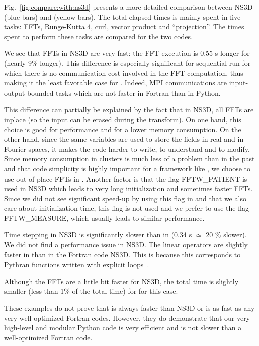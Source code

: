 Fig.~\ref{fig:compare:with:ns3d} presents a more detailed comparison between NS3D
(blue bars) and  (yellow bars).
%
The total elapsed times is mainly spent in five tasks: FFTs, Runge-Kutta 4, curl,
vector product and ``projection''. The times spent to perform these tasks are
compared for the two codes.

We see that FFTs in NS3D are very fast: the FFT execution is 0.55 s longer for
 (nearly 9\% longer). This difference is especially significant for
sequential run for which there is no communication cost involved in the FFT
computation, thus making it the least favorable case for .
Indeed, MPI communications are input-output bounded tasks which are not faster
in Fortran than in Python.

This difference can partially be explained by the fact that in NS3D, all FFTs are
inplace (so the input can be erased during the transform). On one hand, this
choice is good for performance and for a lower memory consumption.  On the other
hand, since the same variables are used to store the fields in real and in Fourier
spaces, it makes the code harder to write, to understand and to modify.  Since
memory consumption in clusters is much less of a problem than in the
past and that code simplicity is highly important for a framework like
, we choose to use out-of-place FFTs in .
%
Another factor is that the flag FFTW\_PATIENT is used in NS3D which leads to very
long initialization and sometimes faster FFTs. Since we did not see significant
speed-up by using this flag in  and that we also care about
initialization time, this flag is not used and we prefer to use the flag
FFTW\_MEASURE, which usually leads to similar performance.

Time stepping in NS3D is significantly slower than in  (0.34 s
$\simeq$ 20 \% slower). We did not find a performance issue in NS3D.
%
The linear operators are slightly faster in  than in the Fortran
code NS3D.  This is because this corresponds to Pythran functions written with
explicit loops~\cite[see][]{fluidfft}.

Although the FFTs are a little bit faster for NS3D, the total time is slightly
smaller (less than 1\% of the total time) for  for this case.

These examples do not prove that  is always faster than NS3D or
is as fast as any very well optimized Fortran codes. However, they do
demonstrate that our very high-level and modular Python code is very efficient
and is not slower than a well-optimized Fortran code.


